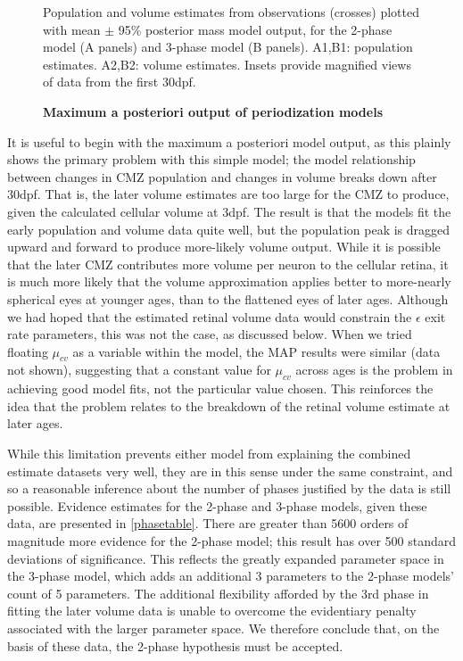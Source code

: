 \begin{figure}[!h]
    \caption{{\bf Maximum a posteriori output of periodization models}}
    \label{phaseMAPout}
    Population and volume estimates from observations (crosses) plotted with mean $\pm$ 95\% posterior mass model output, for the 2-phase model (A panels) and 3-phase model (B panels). A1,B1: population estimates. A2,B2: volume estimates. Insets provide magnified views of data from the first 30dpf.
\end{figure}

It is useful to begin with the maximum a posteriori model output, as this plainly shows the primary problem with this simple model; the model relationship between changes in CMZ population and changes in volume breaks down after 30dpf. That is, the later volume estimates are too large for the CMZ to produce, given the calculated cellular volume at 3dpf. The result is that the models fit the early population and volume data quite well, but the population peak is dragged upward and forward to produce more-likely volume output. While it is possible that the later CMZ contributes more volume per neuron to the cellular retina, it is much more likely that the volume approximation applies better to more-nearly spherical eyes at younger ages, than to the flattened eyes of later ages. Although we had hoped that the estimated retinal volume data would constrain the $\epsilon$ exit rate parameters, this was not the case, as discussed below. When we tried floating $\mu_{cv}$ as a variable within the model, the MAP results were similar (data not shown), suggesting that a constant value for $\mu_{cv}$ across ages is the problem in achieving good model fits, not the particular value chosen. This reinforces the idea that the problem relates to the breakdown of the retinal volume estimate at later ages.

While this limitation prevents either model from explaining the combined estimate datasets very well, they are in this sense under the same constraint, and so a reasonable inference about the number of phases justified by the data is still possible. Evidence estimates for the 2-phase and 3-phase models, given these data, are presented in \autoref{phasetable}. There are greater than 5600 orders of magnitude more evidence for the 2-phase model; this result has over 500 standard deviations of significance. This reflects the greatly expanded parameter space in the 3-phase model, which adds an additional 3 parameters to the 2-phase models' count of 5 parameters. The additional flexibility afforded by the 3rd phase in fitting the later volume data is unable to overcome the evidentiary penalty associated with the larger parameter space. We therefore conclude that, on the basis of these data, the 2-phase hypothesis must be accepted.

